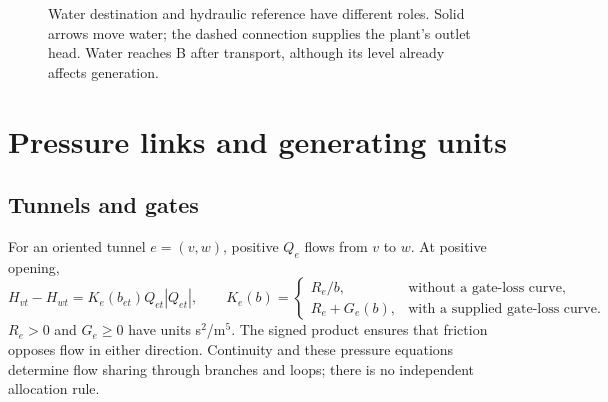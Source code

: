\documentclass[10pt,a4paper]{article}
\begin{document}
\begin{figure}[ht]
\centering
{}
\caption{Water destination and hydraulic reference have different roles.
Solid arrows move water; the dashed connection supplies the plant's outlet
head. Water reaches B after transport, although its level already affects
generation.}
\label{fig:network}
\end{figure}

\section{Pressure links and generating units}

\subsection{Tunnels and gates}

For an oriented tunnel $e=(v,w)$, positive $Q_e$ flows from $v$ to $w$.
At positive opening,
\begin{equation}
H_{vt}-H_{wt}=K_e(b_{et})Q_{et}|Q_{et}|,\qquad
K_e(b)=
\begin{cases}
R_e/b,&\text{without a gate-loss curve},\\
R_e+G_e(b),&\text{with a supplied gate-loss curve}.
\end{cases}
\label{eq:tunnel}
\end{equation}
$R_e>0$ and $G_e\ge0$ have units s$^2$/m$^5$.
The signed product ensures that friction opposes flow in either direction.
Continuity and these pressure equations determine flow sharing through
branches and loops; there is no independent allocation rule.
\end{document}
